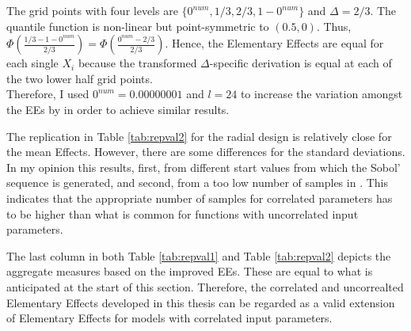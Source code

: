 \documentclass[a4paper,12pt]{article}
\begin{document}
\noindent
The grid points with four levels are $ \{ 0^{num}, 1/3, 2/3, 1-0^{num} \}$ and $\Delta=2/3$. The quantile function is non-linear but point-symmetric to $(0.5, 0)$. Thus, $\Phi(\frac{1/3 - 1-0^{num}}{2/3}) = \Phi(\frac{0^{num} - 2/3}{2/3})$. Hence, the Elementary Effects are equal for each single $X_i$ because the transformed $\Delta$-specific derivation is equal at each of the two lower half grid points.\\

\noindent
Therefore, I used $0^{num}=0.00000001$ and $l=24$ to increase the variation amongst the EEs by \cite{ge2017extending} in order to achieve similar results.

The replication in Table \ref{tab:repval2} for the radial design is relatively close for the mean Effects. However, there are some differences for the standard deviations. In my opinion this results, first, from different start values from which the Sobol' sequence is generated, and second, from a too low number of samples in \cite{ge2017extending}. This indicates that the appropriate number of samples for correlated parameters has to be higher than what is common for functions with uncorrelated input parameters.

The last column in both Table \ref{tab:repval1} and Table \ref{tab:repval2} depicts the aggregate measures based on the improved EEs. These are equal to what is anticipated at the start of this section. Therefore, the correlated and uncorrealted Elementary Effects developed in this thesis can be regarded as a valid extension of Elementary Effects for models with correlated input parameters.

\newpage

\end{document}
